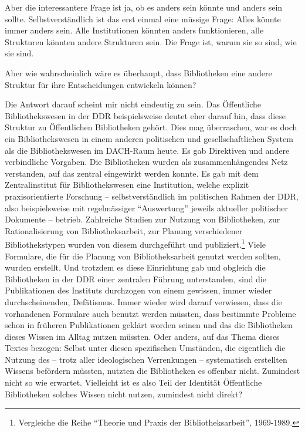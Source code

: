 \documentclass[a4paper,
fontsize=11pt,
oneside,
numbers=noperiodatend,
parskip=half-,
bibliography=totoc,
final
]{scrartcl}
\begin{document}
Aber die interessantere Frage ist ja, ob es anders sein könnte und
anders sein sollte. Selbstverständlich ist das erst einmal eine müssige
Frage: Alles könnte immer anders sein. Alle Institutionen könnten anders
funktionieren, alle Strukturen könnten andere Strukturen sein. Die Frage
ist, warum sie so sind, wie sie sind.

Aber wie wahrscheinlich wäre es überhaupt, dass Bibliotheken eine andere
Struktur für ihre Entscheidungen entwickeln können?

Die Antwort darauf scheint mir nicht eindeutig zu sein. Das Öffentliche
Bibliothekswesen in der DDR beispielsweise deutet eher darauf hin, dass
diese Struktur zu Öffentlichen Bibliotheken gehört. Dies mag
überraschen, war es doch ein Bibliothekswesen in einem anderen
politischen und gesellschaftlichen System als die Bibliothekswesen im
DACH-Raum heute. Es gab Direktiven und andere verbindliche Vorgaben. Die
Bibliotheken wurden als zusammenhängendes Netz verstanden, auf das
zentral eingewirkt werden konnte. Es gab mit dem Zentralinstitut für
Bibliothekswesen eine Institution, welche explizit praxisorientierte
Forschung -- selbstverständlich im politischen Rahmen der DDR, also
beispielsweise mit regelmässiger \enquote{Auswertung} jeweils aktueller
politischer Dokumente -- betrieb. Zahlreiche Studien zur Nutzung von
Bibliotheken, zur Rationalisierung von Bibliotheksarbeit, zur Planung
verschiedener Bibliothekstypen wurden von diesem durchgeführt und
publiziert.\footnote{Vergleiche die Reihe \enquote{Theorie und Praxis
  der Bibliotheksarbeit}, 1969-1989.} Viele Formulare, die für die
Planung von Bibliotheksarbeit genutzt werden sollten, wurden erstellt.
Und trotzdem es diese Einrichtung gab und obgleich die Bibliotheken in
der DDR einer zentralen Führung unterstanden, sind die Publikationen des
Instituts durchzogen von einem gewissen, immer wieder durchscheinenden,
Defätismus. Immer wieder wird darauf verwiesen, dass die vorhandenen
Formulare auch benutzt werden müssten, dass bestimmte Probleme schon in
früheren Publikationen geklärt worden seinen und das die Bibliotheken
dieses Wissen im Alltag nutzen müssten. Oder anders, auf das Thema
dieses Textes bezogen: Selbst unter diesen spezifischen Umständen, die
eigentlich die Nutzung des -- trotz aller ideologischen Verrenkungen --
systematisch erstellten Wissens befördern müssten, nutzten die
Bibliotheken es offenbar nicht. Zumindest nicht so wie erwartet.
Vielleicht ist es also Teil der Identität Öffentliche Bibliotheken
solches Wissen nicht nutzen, zumindest nicht direkt?
\end{document}
